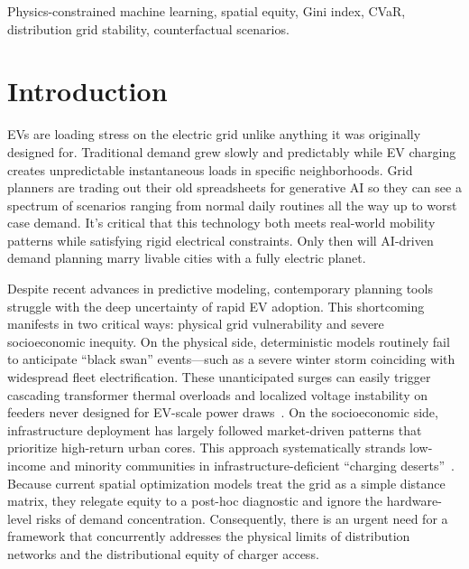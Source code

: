 \documentclass[conference]{IEEEtran}
\begin{document}
\begin{IEEEkeywords}
Physics-constrained machine learning, spatial equity, Gini index, CVaR, distribution grid stability, counterfactual scenarios.
\end{IEEEkeywords}



\section{Introduction}

EVs are loading stress on the electric grid unlike anything it was originally designed for. Traditional demand grew slowly and predictably while EV charging creates unpredictable instantaneous loads in specific neighborhoods. Grid planners are trading out their old spreadsheets for generative AI so they can see a spectrum of scenarios ranging from normal daily routines all the way up to worst case demand. It's critical that this technology both meets real-world mobility patterns while satisfying rigid electrical constraints. Only then will AI-driven demand planning marry livable cities with a fully electric planet.

Despite recent advances in predictive modeling, contemporary planning tools struggle with the deep uncertainty of rapid EV adoption. This shortcoming manifests in two critical ways: physical grid vulnerability and severe socioeconomic inequity. On the physical side, deterministic models routinely fail to anticipate ``black swan'' events---such as a severe winter storm coinciding with widespread fleet electrification. These unanticipated surges can easily trigger cascading transformer thermal overloads and localized voltage instability on feeders never designed for EV-scale power draws~\cite{ref10}. On the socioeconomic side, infrastructure deployment has largely followed market-driven patterns that prioritize high-return urban cores. This approach systematically strands low-income and minority communities in infrastructure-deficient ``charging deserts''~\cite{ref3,ref5}. Because current spatial optimization models treat the grid as a simple distance matrix, they relegate equity to a post-hoc diagnostic and ignore the hardware-level risks of demand concentration. Consequently, there is an urgent need for a framework that concurrently addresses the physical limits of distribution networks and the distributional equity of charger access.
\end{document}
